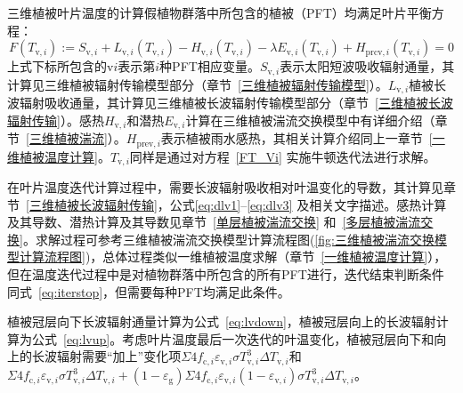 三维植被叶片温度的计算假植物群落中所包含的植被（PFT）均满足叶片平衡方程：
%
\begin{equation}\label{FT_Vi}
  F\left(T_{\mathrm{v},i}\right):=S_{\mathrm{v},i}+L_{\mathrm{v},i}\left(T_{\mathrm{v},i}\right)-H_{\mathrm{v},i}\left(T_{\mathrm{v},i}\right)-\lambda E_{\mathrm{v},i}\left(T_{\mathrm{v},i}\right)+H_{\mathrm{p r c v},i}\left(T_{\mathrm{v},i}\right)=0
\end{equation}
%
上式下标所包含的$\mathrm{v}i$表示第$i$种PFT相应变量。$S_{\mathrm{v},i}$表示太阳短波吸收辐射通量，其计算见三维植被辐射传输模型部分（章节~\ref{三维植被辐射传输模型}）。$L_{\mathrm{v},i}$植被长波辐射吸收通量，其计算见三维植被长波辐射传输模型部分（章节~\ref{三维植被长波辐射传输}）。感热$H_{\mathrm{v},i}$和潜热$E_{\mathrm{v},i}$计算在三维植被湍流交换模型中有详细介绍（章节~\ref{三维植被湍流}）。$H_{\mathrm{prev},i}$表示植被雨水感热，其相关计算介绍同上一章节~\ref{一维植被温度计算}。$T_{\mathrm{v},i}$同样是通过对方程~\eqref{FT_Vi} 实施牛顿迭代法进行求解。

在叶片温度迭代计算过程中，需要长波辐射吸收相对叶温变化的导数，其计算见章节~\ref{三维植被长波辐射传输}，公式\eqref{eq:dlv1}--\eqref{eq:dlv3} 及相关文字描述。感热计算及其导数、潜热计算及其导数见章节~\ref{单层植被湍流交换} 和~\ref{多层植被湍流交换}。求解过程可参考三维植被湍流交换模型计算流程图(\ref{fig:三维植被湍流交换模型计算流程图})，总体过程类似一维植被温度求解（章节~\ref{一维植被温度计算}），但在温度迭代过程中是对植物群落中所包含的所有PFT进行，迭代结束判断条件同式~\eqref{eq:iterstop}，但需要每种PFT均满足此条件。

植被冠层向下长波辐射通量计算为公式~\eqref{eq:lvdown}，植被冠层向上的长波辐射计算为公式~\eqref{eq:lvup}。考虑叶片温度最后一次迭代的叶温变化，植被冠层向下和向上的长波辐射需要“加上”变化项$\Sigma4f_{\mathrm{c},i}\varepsilon_{\mathrm{v},i}\sigma T_{\mathrm{v},i}^3\Delta T_{\mathrm{v},i}$和$\Sigma 4 f_{\mathrm{c},i} \varepsilon_{\mathrm{v},i} \sigma T_{\mathrm{v},i}^{3} \Delta T_{\mathrm{v},i}+\left(1-\varepsilon_{\mathrm{g}}\right) \Sigma 4 f_{\mathrm{c},i} \varepsilon_{\mathrm{v},i}\left(1-\varepsilon_{\mathrm{v},i}\right) \sigma T_{\mathrm{v},i}^{3} \Delta T_{\mathrm{v},i}$。
